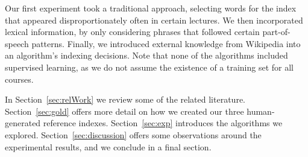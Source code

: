 Our first experiment took a traditional approach, selecting words for
the index that appeared disproportionately often in certain
lectures. We then incorporated lexical information, by only
considering phrases that followed certain part-of-speech
patterns. Finally, we introduced external knowledge from Wikipedia
into an algorithm's indexing decisions. Note that none of the
algorithms included supervised learning, as we do not assume the
existence of a training set for all courses.

In Section~\ref{sec:relWork} we review some of the related
literature. Section~\ref{sec:gold} offers more detail on how we
created our three human-generated reference
indexes. Section~\ref{sec:exp} introduces the algorithms we
explored. Section~\ref{sec:discussion} offers some observations around
the experimental results, and we conclude in a final section.




